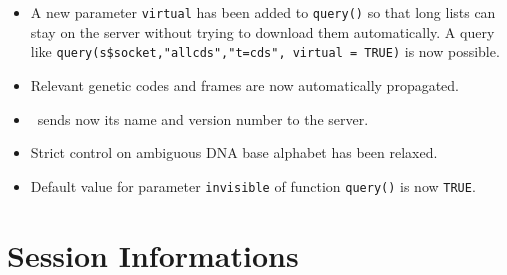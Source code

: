 \documentclass{article}
\begin{document}
\begin{itemize}
\item A new parameter \texttt{virtual} has been added to \texttt{query()} 
so that long lists can stay on the server without trying to download
them automatically. A query like \texttt{query(s\$socket,"allcds","t=cds", virtual = TRUE)} is 
now possible.

\item Relevant genetic codes and frames are now automatically propagated.

\item \Seqinr{}~sends now its name and version number to the server.

\item Strict control on ambiguous DNA base alphabet has been relaxed.

\item Default value for parameter \texttt{invisible} of function \texttt{query()} is now \texttt{TRUE}.

\end{itemize}



\section*{Session Informations}
\end{document}
